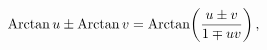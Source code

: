 \[\mathop{\mathrm{Arctan}\/}\nolimits u\pm\mathop{\mathrm{Arctan}\/}\nolimits v=%
\mathop{\mathrm{Arctan}\/}\nolimits\!\left(\frac{u\pm v}{1\mp uv}\right),\]